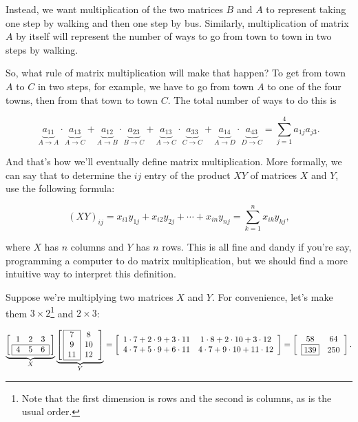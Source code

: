 \documentclass[../gatm.tex]{subfiles}
\begin{document}
Instead, we want multiplication of the two matrices $B$ and $A$ to represent taking one step by walking and then one step by bus. Similarly, multiplication of matrix $A$ by itself will represent the number of ways to go from town to town in two steps by walking.

So, what rule of matrix multiplication will make that happen? To get from town $A$ to $C$ in two steps, for example, we have to go from town $A$ to one of the four towns, then from that town to town $C$. The total number of ways to do this is

$$\underbrace{a_{11}}_{A\to A}\cdot \underbrace{a_{13}}_{A\to C}+\underbrace{a_{12}}_{A\to B}\cdot \underbrace{a_{23}}_{B\to C}+\underbrace{a_{13}}_{A\to C}\cdot \underbrace{a_{33}}_{C\to C}+\underbrace{a_{14}}_{A\to D}\cdot \underbrace{a_{43}}_{D\to C}=\sum_{j=1}^{4}a_{1j}a_{j3}.$$

And that's how we'll eventually define matrix multiplication. More formally, we can say that to determine the $ij$ entry of the product $XY$ of matrices $X$ and $Y$, use the following formula:

$$(XY)_{ij}=x_{i1}y_{1j}+x_{i2}y_{2j}+\cdots + x_{in}y_{nj} = \sum_{k=1}^n x_{ik} y_{kj},$$

where $X$ has $n$ columns and $Y$ has $n$ rows. This is all fine and dandy if you're say, programming a computer to do matrix multiplication, but we should find a more intuitive way to interpret this definition.

Suppose we're multiplying two matrices $X$ and $Y$. For convenience, let's make them $3\times 2$\footnote{Note that the first dimension is rows and the second is columns, as is the usual order.} and $2\times 3$:

\begin{center}
$$\underbrace{\left[\,\begin{array}{ccc}
1                      & 2 & 3                      \\ \hline
\multicolumn{1}{|l}{4} & 5 & \multicolumn{1}{l|}{6} \\ \hline
\end{array}\,\right]}_{X}\underbrace{\left[\,\begin{array}{|c|c}
\cline{1-1}
7  & 8  \\
9  & 10 \\
11 & 12 \\ \cline{1-1}
\end{array}\,\right]}_{Y}=\left[\begin{array}{cc}
1\cdot 7 + 2\cdot 9 + 3\cdot 11 & 1\cdot 8 + 2\cdot 10 + 3\cdot 12 \\
4\cdot 7 + 5\cdot 9 + 6\cdot 11 & 4\cdot 7 + 9\cdot 10 + 11\cdot 12 \\
\end{array}
\right]=\left[\begin{array}{cc}
58 & 64 \\
\boxed{139} & 250 \\
\end{array}\right].$$
\end{center}
\end{document}

